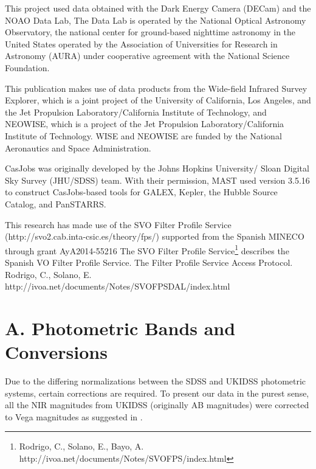 \documentclass[usenatbib]{mnras}
\begin{document}
This project used data obtained with the Dark Energy Camera (DECam)
and the NOAO Data Lab, The Data Lab is operated by the National
Optical Astronomy Observatory, the national center for ground-based
nighttime astronomy in the United States operated by the Association
of Universities for Research in Astronomy (AURA) under cooperative
agreement with the National Science Foundation.

This publication makes use of data products from the Wide-field
Infrared Survey Explorer, which is a joint project of the University
of California, Los Angeles, and the Jet Propulsion
Laboratory/California Institute of Technology, and NEOWISE, which is a
project of the Jet Propulsion Laboratory/California Institute of
Technology. WISE and NEOWISE are funded by the National Aeronautics
and Space Administration.

CasJobs was originally developed by the Johns Hopkins University/
Sloan Digital Sky Survey (JHU/SDSS) team. With their permission, MAST
used version 3.5.16 to construct CasJobs-based tools for GALEX,
Kepler, the Hubble Source Catalog, and PanSTARRS.

This research has made use of the SVO Filter Profile Service
(http://svo2.cab.inta-csic.es/theory/fps/) supported from the Spanish
MINECO through grant AyA2014-55216 
The SVO Filter Profile Service\footnote{Rodrigo, C., Solano, E., Bayo, A. http://ivoa.net/documents/Notes/SVOFPS/index.html}
describes the Spanish VO Filter Profile Service. 
The Filter Profile Service Access Protocol. Rodrigo, C., Solano, E. http://ivoa.net/documents/Notes/SVOFPSDAL/index.html

\newpage





\appendix

\section{A. Photometric Bands and Conversions}\label{sec:filters} 
    Due to the differing normalizations between the
    SDSS and  UKIDSS photometric systems, certain corrections are required.  To present
    our data in the  purest sense, all the NIR magnitudes from UKIDSS
    (originally AB magnitudes)  were corrected to Vega magnitudes as
    suggested in \citet{Hewett2006}.
    
\end{document}
